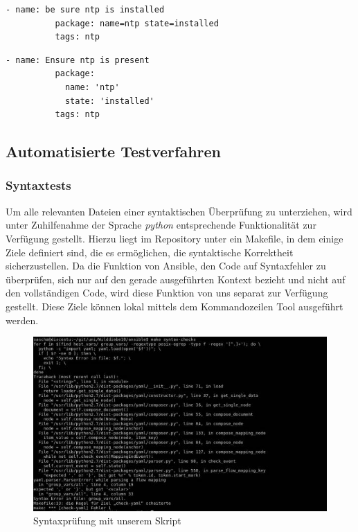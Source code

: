 \begin{minipage}{\textwidth}
\begin{lstlisting}[label=code:ansiblebpbad,caption=Formatierung nach Standard]
        - name: be sure ntp is installed
          package: name=ntp state=installed
          tags: ntp
\end{lstlisting}
\end{minipage}

\begin{lstlisting}[label=code:ansiblebpgood,caption=Unsere verwendete Formatierung]
        - name: Ensure ntp is present
          package:
            name: 'ntp'
            state: 'installed'
          tags: ntp
\end{lstlisting}

\subsection{Automatisierte Testverfahren}
\subsubsection{Syntaxtests}
Um alle relevanten Dateien einer syntaktischen Überprüfung zu unterziehen, wird unter Zuhilfenahme der Sprache \emph{python} entsprechende Funktionalität zur Verfügung gestellt. Hierzu liegt im Repository unter  ein Makefile, in dem einige Ziele definiert sind, die es ermöglichen, die syntaktische Korrektheit sicherzustellen. Da die Funktion von Ansible, den Code auf Syntaxfehler zu überprüfen, sich nur auf den gerade ausgeführten Kontext bezieht und nicht auf den vollständigen Code, wird diese Funktion von uns separat zur Verfügung gestellt. Diese Ziele können lokal mittels dem Kommandozeilen Tool  ausgeführt werden.

\begin{figure}[!htbp]
	\centering
		\includegraphics[scale=0.75]{images/syntaxchecks.jpg}
	\caption{Syntaxprüfung mit unserem Skript}
	\label{img:syntaxcheck}
\end{figure}

